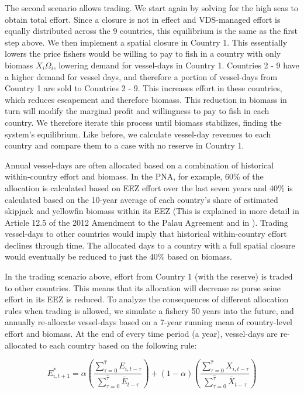 \documentclass[12pt]{article}
\begin{document}
The second scenario allows trading. We start again by solving for the high seas to obtain total effort. Since a closure is not in effect and VDS-managed effort is equally distributed across the 9 countries, this equilibrium is the same as the first step above. We then implement a spatial closure in Country 1. This essentially lowers the price fishers would be willing to pay to fish in a country with only biomass $X_i\Omega_i$, lowering demand for vessel-days in Country 1. Countries 2 - 9 have a higher demand for vessel days, and therefore a portion of vessel-days from Country 1 are sold to Countries 2 - 9. This increases effort in these countries, which reduces escapement and therefore biomass. This reduction in biomass in turn will modify the marginal profit and willingness to pay to fish in each country. We therefore iterate this process until biomass stabilizes, finding the system's equilibrium. Like before, we calculate vessel-day revenues to each country and compare them to a case with no reserve in Country 1.

Annual vessel-days are often allocated based on a combination of historical within-country effort and biomass. In the PNA, for example, 60\% of the allocation is calculated based on EEZ effort over the last seven years and 40\% is calculated based on the 10-year average of each country’s share of estimated skipjack and yellowfin biomass within its EEZ (This is explained in more detail in Article 12.5 of the 2012 Amendment to the Palau Agreement and in \cite{Hagrannsoknir2014}). Trading vessel-days to other countries would imply that historical within-country effort declines through time. The allocated days to a country with a full spatial closure would eventually be reduced to just the 40\% based on biomass.

In the trading scenario above, effort from Country 1 (with the reserve) is traded to other countries. This means that its allocation will decrease as purse seine effort in its EEZ is reduced. To analyze the consequences of different allocation rules when trading is allowed, we simulate a fishery 50 years into the future, and annually re-allocate vessel-days based on a 7-year running mean of country-level effort and biomass. At the end of every time period (a year), vessel-days are re-allocated to each country based on the following rule:

$$
E_{i,t+1}^* = \alpha
\left(\frac{\sum_{\tau = 0}^{\hat{\tau}}E_{i,t-\tau}}{\sum_{\tau = 0}^{\hat{\tau}}\bar{E}_{{t-\tau}}}
	\right)
	+
(1 - \alpha)
\left(\frac{\sum_{\tau = 0}^{\hat{\tau}}X_{i,t-\tau}}{\sum_{\tau = 0}^{\hat{\tau}}\bar{X}_{t-\tau}} \right)
$$
\end{document}
